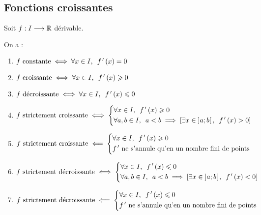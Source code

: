 \subsection{Fonctions croissantes}

\begin{theo}
Soit \(f:I\longrightarrow\mathbb{R}\) dérivable.

On a :

\begin{enumerate}
\item \(f\text{ constante}\ssi\quantifs{\forall x\in I}f\prim\paren{x}=0\) \\

\item \(f\text{ croissante}\ssi\quantifs{\forall x\in I}f\prim\paren{x}\geq0\) \\

\item \(f\text{ décroissante}\ssi\quantifs{\forall x\in I}f\prim\paren{x}\leq0\) \\

\item \(f\text{ strictement croissante}\ssi\begin{dcases}\quantifs{\forall x\in I}f\prim\paren{x}\geq0 \\ \quantifs{\forall a,b\in I}a<b\imp\croch{\quantifs{\exists x\in\intervee{a}{b}}f\prim\paren{x}>0}\end{dcases}\) \\

\item \(f\text{ strictement croissante}\impr\begin{dcases}\quantifs{\forall x\in I}f\prim\paren{x}\geq0 \\ f\prim\text{ ne s'annule qu'en un nombre fini de points}\end{dcases}\) \\

\item \(f\text{ strictement décroissante}\ssi\begin{dcases}\quantifs{\forall x\in I}f\prim\paren{x}\leq0 \\ \quantifs{\forall a,b\in I}a<b\imp\croch{\quantifs{\exists x\in\intervee{a}{b}}f\prim\paren{x}<0}\end{dcases}\) \\

\item \(f\text{ strictement décroissante}\impr\begin{dcases}\quantifs{\forall x\in I}f\prim\paren{x}\leq0 \\ f\prim\text{ ne s'annule qu'en un nombre fini de points}\end{dcases}\)
\end{enumerate}
\end{theo}

